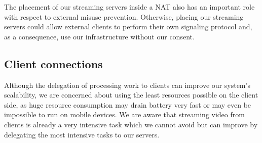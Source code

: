 The placement of our streaming servers inside a \ac{NAT} also has an important role with respect to external misuse prevention. Otherwise, placing our streaming servers could allow external clients to perform their own signaling protocol and, as a consequence, use our infrastructure without our consent.

\subsection{Client connections}
	Although the delegation of processing work to clients can improve our system's scalability, we are concerned about using the least resources possible on the client side, as huge resource consumption may drain battery very fast or may even be impossible to run on mobile devices. We are aware that streaming video from clients is already a very intensive task which we cannot avoid but can improve by delegating the most intensive tasks to our servers. 

